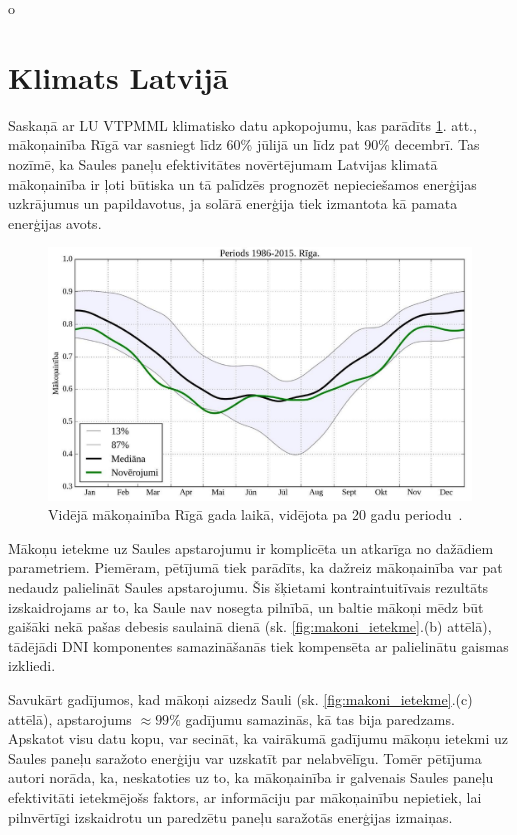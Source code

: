o\section{Klimats Latvijā}

Saskaņā ar LU VTPMML klimatisko datu apkopojumu, kas parādīts \ref{fig:makoni_Riga}. att., mākoņainība Rīgā var sasniegt līdz 60\% jūlijā un līdz pat 90\% decembrī. Tas nozīmē, ka Saules paneļu efektivitātes novērtējumam Latvijas klimatā mākoņainība ir ļoti būtiska un tā palīdzēs prognozēt nepieciešamos enerģijas uzkrājumus un papildavotus, ja solārā enerģija tiek izmantota kā pamata enerģijas avots.
\begin{figure}[h]
	\centering
	\includegraphics[width=0.8\linewidth]{figures/misc/makoni_riga.jpg}
	\caption{Vidējā mākoņainība Rīgā gada laikā, vidējota pa 20 gadu periodu~\cite{cloudsModlab}.}
	\label{fig:makoni_Riga}
\end{figure}

Mākoņu ietekme uz Saules apstarojumu ir komplicēta un atkarīga no dažādiem parametriem. Piemēram, pētījumā \cite{CloudCoverageImpactOnIrradiance} tiek parādīts, ka dažreiz mākoņainība var pat nedaudz palielināt Saules apstarojumu. Šis šķietami kontraintuitīvais rezultāts izskaidrojams ar to, ka Saule nav nosegta pilnībā, un baltie mākoņi mēdz būt gaišāki nekā pašas debesis saulainā dienā (sk. \ref{fig:makoni_ietekme}.(b) attēlā), tādējādi DNI komponentes samazināšanās tiek kompensēta ar palielinātu gaismas izkliedi. 

Savukārt gadījumos, kad mākoņi aizsedz Sauli (sk. \ref{fig:makoni_ietekme}.(c) attēlā), apstarojums $\approx99\%$ gadījumu samazinās, kā tas bija paredzams.
Apskatot visu datu kopu, var secināt, ka vairākumā gadījumu mākoņu ietekmi uz Saules paneļu saražoto enerģiju var uzskatīt par nelabvēlīgu. Tomēr pētījuma autori norāda, ka, neskatoties uz to, ka mākoņainība ir galvenais Saules paneļu efektivitāti ietekmējošs faktors, ar informāciju par mākoņainību nepietiek, lai pilnvērtīgi izskaidrotu un paredzētu paneļu saražotās enerģijas izmaiņas.

